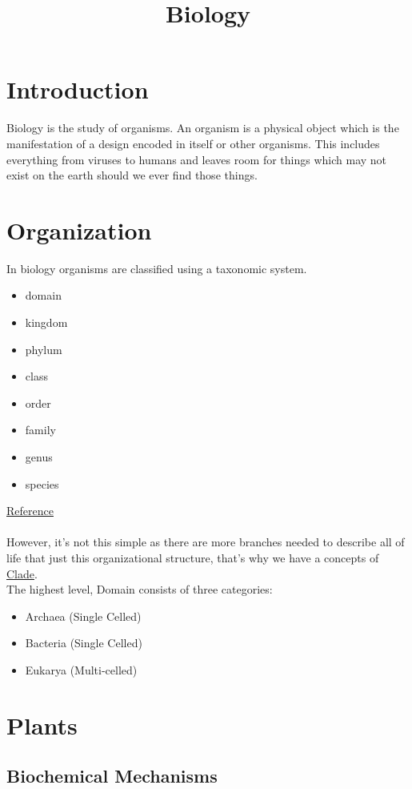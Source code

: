 \documentclass[10pt]{extarticle}
\title{Biology}
\begin{document}
\maketitle
\noindent
\section{Introduction} 
Biology is the study of organisms. 
An organism is a physical object which is the manifestation of a design encoded in itself or other organisms. This includes everything from viruses to  humans and leaves room for things which may not exist on the earth should we ever find those things. 
\section{Organization}
In biology organisms are classified using a taxonomic system. 
\begin{itemize}
\item domain
\item kingdom
\item phylum 
\item class
\item order
\item family
\item genus
\item species
\end{itemize}
\href{https://en.wikipedia.org/wiki/Taxonomy_(biology)#Modern_system_of_classification}{Reference} \\ \\
However, it's not this simple as there are more branches needed to describe all of life that just this organizational structure, that's why we have a concepts of  \href{https://en.wikipedia.org/wiki/Clade}{Clade}.  \\
The highest level, Domain consists of three categories:
\begin{itemize}
	\item Archaea (Single Celled)
	\item Bacteria (Single Celled)
	\item Eukarya (Multi-celled)
\end{itemize}

\section{Plants}

\subsection{Biochemical Mechanisms}
\end{document}
